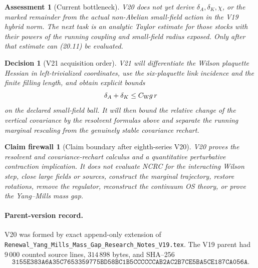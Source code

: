 \documentclass[11pt,oneside]{book}
\newtheorem{assessment}[theorem]{Assessment}
\newtheorem{firewall}[theorem]{Claim firewall}
\newtheorem{decision}[theorem]{Decision}
\theoremstyle{definition}
\theoremstyle{remark}
\begin{document}
\begin{assessment}[Current bottleneck]
\label{ass:e8v20-remains}
V20 does not yet derive \(\delta_A,\delta_K,\chi\), or the marked
remainder from the actual non-Abelian small-field action in the V19
hybrid norm.  The next task is an analytic Taylor estimate for those
stocks with their powers of the running coupling and small-field
radius exposed.  Only after that estimate can (20.11) be evaluated.
\end{assessment}

\begin{decision}[V21 acquisition order]
\label{dec:e8v20-v21}
V21 will differentiate the Wilson plaquette Hessian in left-trivialized
coordinates, use the six-plaquette link incidence and the finite
filling length, and obtain explicit bounds
\[
\delta_A+\delta_K\leq C_{\rm W}g\,r
\]
on the declared small-field ball.  It will then bound the relative
change of the vertical covariance by the resolvent formulas above and
separate the running marginal rescaling from the genuinely stable
covariance rechart.
\end{decision}

\begin{firewall}[Claim boundary after eighth-series V20]
\label{fire:e8v20-claim}
V20 proves the resolvent and covariance-rechart calculus and a
quantitative perturbative contraction implication.  It does not
evaluate NCRC for the interacting Wilson step, close large fields or
sources, construct the marginal trajectory, restore rotations, remove
the regulator, reconstruct the continuum OS theory, or prove the
Yang--Mills mass gap.
\end{firewall}

\paragraph{Parent-version record.}
V20 was formed by exact append-only extension of
\texttt{Renewal\_Yang\_Mills\_Mass\_Gap\_Research\_Notes\_V19.tex}.
The V19 parent had \(9\,000\) counted source lines,
\(314\,898\) bytes, and SHA--256
\[
\texttt{3155E383A6A35C7653359775BD58BC1B5CCCCCCAB2AC2B7CE5BA5CE187CA056A}.
\]


\end{document}
